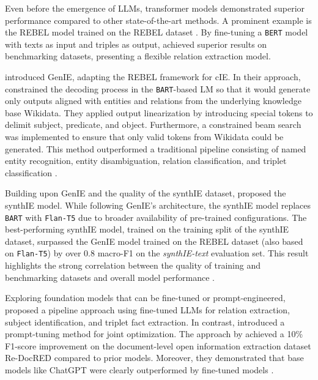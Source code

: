 \documentclass[a4paper,oneside,bibliography=totoc]{scrbook}
\begin{document}
Even before the emergence of \acp{LLM}, transformer models demonstrated superior performance compared to other state-of-the-art methods. A prominent example is the REBEL model trained on the REBEL dataset \cite{HuguetCabot2021}. By fine-tuning a \texttt{BERT} model with texts as input and triples as output, \citet{HuguetCabot2021} achieved superior results on benchmarking datasets, presenting a flexible relation extraction model.

\citet{Josifoski2021} introduced GenIE, adapting the REBEL framework for \ac{cIE}. In their approach, \citet{Josifoski2021} constrained the decoding process in the \texttt{BART}-based \ac{LM} so that it would generate only outputs aligned with entities and relations from the underlying knowledge base Wikidata. They applied output linearization by introducing special tokens to delimit subject, predicate, and object. Furthermore, a constrained beam search was implemented to ensure that only valid tokens from Wikidata could be generated. This method outperformed a traditional pipeline consisting of named entity recognition, entity disambiguation, relation classification, and triplet classification \cite{Josifoski2021}.

Building upon GenIE and the quality of the synthIE dataset, \citet{Josifoski2023} proposed the synthIE model. While following GenIE’s architecture, the synthIE model replaces \texttt{BART} with \texttt{Flan-T5} due to broader availability of pre-trained configurations. The best-performing synthIE model, trained on the training split of the synthIE dataset, surpassed the GenIE model trained on the REBEL dataset (also based on \texttt{Flan-T5}) by over 0.8 macro-F1 on the \textit{synthIE-text} evaluation set. This result highlights the strong correlation between the quality of training and benchmarking datasets and overall model performance \cite{Josifoski2023}.

Exploring foundation models that can be fine-tuned or prompt-engineered, \citet{Xue2024} proposed a pipeline approach using fine-tuned \acp{LLM} for relation extraction, subject identification, and triplet fact extraction. In contrast, \citet{Chen2024} introduced a prompt-tuning method for joint optimization. The approach by \citet{Xue2024} achieved a 10\% F1-score improvement on the document-level open information extraction dataset Re-DocRED compared to prior models. Moreover, they demonstrated that base models like ChatGPT were clearly outperformed by fine-tuned models \cite{Xue2024}.
\end{document}
